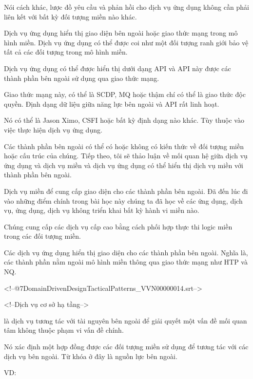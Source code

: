 Nói cách khác, lược đồ yêu cầu và phản hồi cho dịch vụ ứng dụng không cần phải liên kết với bất kỳ đối tượng miền nào khác.

Dịch vụ ứng dụng hiển thị giao diện bên ngoài hoặc giao thức mạng trong mô hình miền. Dịch vụ ứng dụng có thể được coi như một đối tượng ranh giới bảo vệ tất cả các đối tượng trong mô hình miền.

Dịch vụ ứng dụng có thể được hiển thị dưới dạng API và API này được các thành phần bên ngoài sử dụng qua giao thức mạng.

Giao thức mạng này, có thể là SCDP, MQ hoặc thậm chí có thể là giao thức độc quyền. Định dạng dữ liệu giữa năng lực bên ngoài và API rất linh hoạt.

Nó có thể là Jason Ximo, CSFI hoặc bất kỳ định dạng nào khác. Tùy thuộc vào việc thực hiện dịch vụ ứng dụng.

Các thành phần bên ngoài có thể có hoặc không có kiến ​​thức về đối tượng miền hoặc cấu trúc của chúng. Tiếp theo, tôi sẽ thảo luận về mối quan hệ giữa dịch vụ ứng dụng và dịch vụ miền và dịch vụ ứng dụng có thể hiển thị dịch vụ miền với thành phần bên ngoài.

Dịch vụ miền để cung cấp giao diện cho các thành phần bên ngoài. Đã đến lúc đi vào những điểm chính trong bài học này chúng ta đã học về các ứng dụng, dịch vụ, ứng dụng, dịch vụ không triển khai bất kỳ hành vi miền nào.

Chúng cung cấp các dịch vụ cấp cao bằng cách phối hợp thực thi logic miền trong các đối tượng miền.

Các dịch vụ ứng dụng hiển thị giao diện cho các thành phần bên ngoài. Nghĩa là, các thành phần nằm ngoài mô hình miền thông qua giao thức mạng như HTP và NQ.













<!--@\07DomainDrivenDesignTacticalPatterns_VVN\000000014.srt-->

<!--Dịch vụ cơ sở hạ tầng-->

là dịch vụ tương tác với tài nguyên bên ngoài để giải quyết một vấn đề mối quan tâm không thuộc phạm vi vấn đề chính.

Nó xác định một hợp đồng được các đối tượng miền sử dụng để tương tác với các dịch vụ bên ngoài. Từ khóa ở đây là nguồn lực bên ngoài.

VD:

